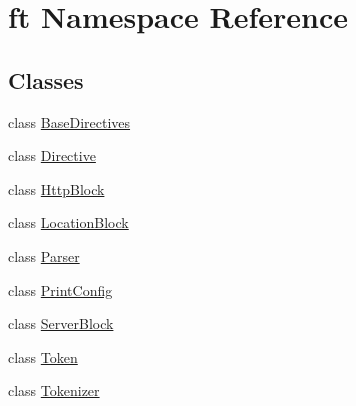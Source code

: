 \hypertarget{namespaceft}{}\section{ft Namespace Reference}
\label{namespaceft}
\subsection*{Classes}
\begin{DoxyCompactItemize}
\item 
class \hyperlink{classft_1_1_base_directives}{Base\+Directives}
\item 
class \hyperlink{classft_1_1_directive}{Directive}
\item 
class \hyperlink{classft_1_1_http_block}{Http\+Block}
\item 
class \hyperlink{classft_1_1_location_block}{Location\+Block}
\item 
class \hyperlink{classft_1_1_parser}{Parser}
\item 
class \hyperlink{classft_1_1_print_config}{Print\+Config}
\item 
class \hyperlink{classft_1_1_server_block}{Server\+Block}
\item 
class \hyperlink{classft_1_1_token}{Token}
\item 
class \hyperlink{classft_1_1_tokenizer}{Tokenizer}
\end{DoxyCompactItemize}
